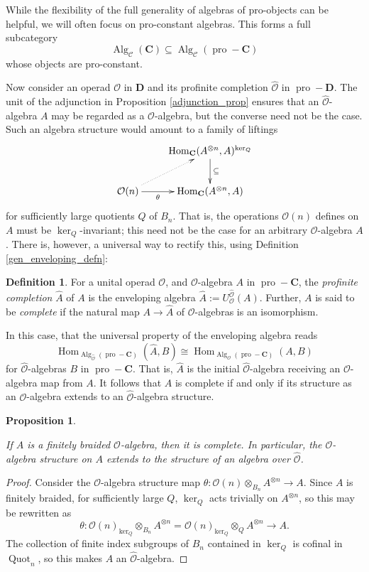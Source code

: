 \documentclass[12pt]{article}
\DeclareMathOperator{\Alg}{Alg}
\DeclareMathOperator{\Quot}{Quot}
\DeclareMathOperator{\Hom}{Hom}
\DeclareMathOperator{\pro}{pro}
\newcommand{\Ahat}{\widehat{A}}
\newcommand{\CC} {\mathcal{C}}
\newcommand{\bC} {\mathbf{C}}
\newcommand{\bD} {\mathbf{D}}
\newcommand{\proC}{\pro\!-\bC}
\newcommand{\proD}{\pro\!-\bD}
\newcommand{\OO}{\mathcal{O}}
\newcommand{\OOhat}{\widehat{\OO}}
\theoremstyle{plain}
\newtheorem{prop}[thm]{Proposition}
\theoremstyle{definition}
\newtheorem{defn}[thm]{Definition}
\theoremstyle{remark}
\begin{document}
While the flexibility of the full generality of algebras of pro-objects can be helpful, we will often focus on pro-constant algebras.  This forms a full subcategory  
%
$$\Alg_{\CC}(\bC) \subseteq \Alg_{\CC}(\pro-\bC)$$
%
whose objects are pro-constant.

Now consider an operad $\OO$ in $\bD$ and its profinite completion $\OOhat$ in $\proD$.  The unit of the adjunction in Proposition \ref{adjunction_prop} ensures that an $\OOhat$-algebra $A$ may be regarded as a $\OO$-algebra, but the converse need not be the case. Such an algebra structure would amount to a family of liftings
%
$$\xymatrix{
 & \Hom_{\bC}(A^{\otimes n}, A)^{\ker_Q} \ar[d]^-{\subseteq} \\
\OO(n) \ar[r]_-{\theta} \ar@{.>}[ur] & \Hom_{\bC}(A^{\otimes n}, A)
}$$
%
for sufficiently large quotients $Q$ of $B_n$.  That is, the operations $\OO(n)$ defines on $A$ must be $\ker_Q$-invariant; this need not be the case for an arbitrary $\OO$-algebra $A$.  There is, however, a universal way to rectify this, using Definition \ref{gen_enveloping_defn}:

\begin{defn} For a unital operad $\OO$, and $\OO$-algebra $A$ in $\proC$, the \emph{profinite completion} $\Ahat$ of $A$ is the enveloping algebra $\Ahat:= U_{\OO}^{\OOhat}(A)$. Further, $A$ is said to be \emph{complete} if the natural map $A \to \Ahat$ of $\OO$-algebras is an isomorphism.  \end{defn}

In this case, that the universal property of the enveloping algebra reads 
%
$$\Hom_{\Alg_{\OOhat}(\proC)}(\Ahat, B) \cong \Hom_{\Alg_{\OO}(\proC)}(A, B)$$
%
for $\OOhat$-algebras $B$ in $\proC$.  That is, $\Ahat$ is the initial $\OOhat$-algebra receiving an $\OO$-algebra map from $A$.  It follows that $A$ is complete if and only if its structure as an $\OO$-algebra extends to an $\OOhat$-algebra structure.

\begin{prop} \label{pro_const_alg_prop}

If $A$ is a finitely braided $\OO$-algebra, then it is complete.  In particular, the $\OO$-algebra structure on $A$ extends to the structure of an algebra over $\OOhat$. 

\end{prop}

\begin{proof}

Consider the $\OO$-algebra structure map $\theta: \OO(n) \otimes_{B_n} A^{\otimes n} \to A$.  Since $A$ is finitely braided, for sufficiently large $Q$, $\ker_Q$ acts trivially on $A^{\otimes n}$, so this may be rewritten as
%
$$\theta: \OO(n)_{\ker_Q} \otimes_{B_n} A^{\otimes n} = \OO(n)_{\ker_Q} \otimes_{Q} A^{\otimes n} \to A.$$
%
The collection of finite index subgroups of $B_n$ contained in $\ker_Q$ is cofinal in $\Quot_n$, so this makes $A$ an $\OOhat$-algebra.

\end{proof}
\end{document}
